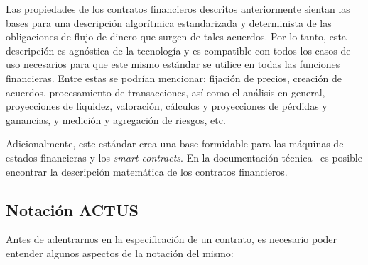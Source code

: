 \documentclass[12pt]{book}
\begin{document}
Las propiedades de los contratos financieros descritos anteriormente sientan las bases para una descripción algorítmica estandarizada y determinista de las obligaciones de flujo de dinero que surgen de tales acuerdos. Por lo tanto, esta descripción es agnóstica de la tecnología y es compatible con todos los casos de uso necesarios para que este mismo estándar se utilice en todas las funciones financieras. Entre estas se podrían mencionar: fijación de precios, creación de acuerdos, procesamiento de transacciones, así como el análisis en general, proyecciones de liquidez, valoración, cálculos y proyecciones de pérdidas y ganancias, y medición y agregación de riesgos, etc.

Adicionalmente, este estándar crea una base formidable para las máquinas de estados financieras y los \textit{smart contracts}. En la documentación técnica~\cite{ACTUS_Techspecs} es posible encontrar la descripción matemática de los contratos financieros.


\subsection{Notación ACTUS}

Antes de adentrarnos en la especificación de un contrato, es necesario poder entender algunos aspectos de la notación del mismo:
\end{document}
